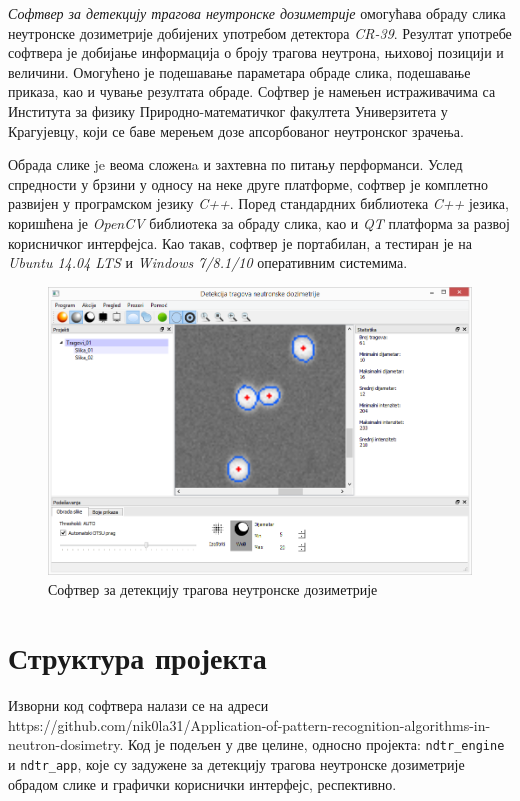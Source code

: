 \documentclass[11pt,a4paper,serbian,oneside]{book}
\begin{document}
\textit{Софтвер за детекцију трагова неутронске дозиметрије} омогућава обраду слика неутронске дозиметрије добијених употребом детектора \textit{CR-39}. Резултат употребе софтвера је добијање информација о броју трагова неутрона, њиховој позицији и величини. Омогућено је подешавање параметара обраде слика, подешавање приказа, као и чување резултата обраде. Софтвер је намењен истраживачима са Института за физику Природно-математичког факултета Универзитета у Крагујевцу, који се баве мерењем дозе апсорбованог неутронског зрачења.

Обрада слике je веома сложенa и захтевна по питању перформанси. Услед спредности у брзини у односу на неке друге платформе, софтвер је комплетно развијен у програмском језику \textit{C++}. Поред стандардних библиотека \textit{C++} језика, коришћена је \textit{OpenCV} библиотека за обраду слика, као и \textit{QT} платформа за развој корисничког интерфејса. Као такав, софтвер је портабилан, а тестиран је на \textit{Ubuntu 14.04 LTS} и \textit{Windows 7/8.1/10} оперативним системима.

\begin{figure}[H]
\begin{center}
\includegraphics[width=135mm]{images/softver.PNG}
\end{center}
\caption{Софтвер за детекцију трагова неутронске дозиметрије}
\label{fig:softver}
\end{figure}

\section{Структура пројекта}
Изворни код софтвера налази се на адреси https://github.com/nik0la31/Application-of-pattern-recognition-algorithms-in-neutron-dosimetry. Код је подељен у две целине, односно пројекта: \texttt{ndtr\_engine} и \texttt{ndtr\_app}, које су задужене за детекцију трагова неутронске дозиметрије обрадом слике и графички кориснички интерфејс, респективно.
\end{document}
